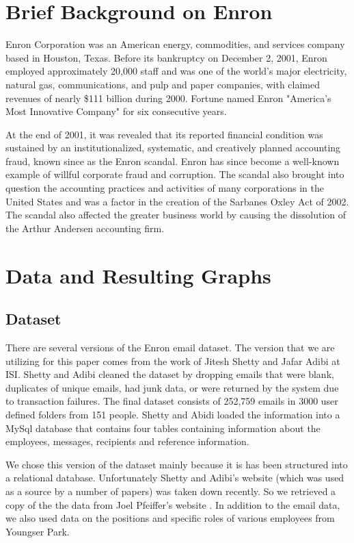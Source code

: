 \documentclass[12pt]{article}
\begin{document}
\section{Brief Background on Enron}
Enron Corporation was an American energy, commodities, and services company based in Houston, Texas. Before its bankruptcy on December 2, 2001, Enron employed approximately 20,000 staff and was one of the world's major electricity, natural gas, communications, and pulp and paper companies, with claimed revenues of nearly \$111 billion during 2000. Fortune named Enron "America's Most Innovative Company" for six consecutive years.

At the end of 2001, it was revealed that its reported financial condition was sustained by an institutionalized, systematic, and creatively planned accounting fraud, known since as the Enron scandal. Enron has since become a well-known example of willful corporate fraud and corruption. The scandal also brought into question the accounting practices and activities of many corporations in the United States and was a factor in the creation of the Sarbanes Oxley Act of 2002. The scandal also affected the greater business world by causing the dissolution of the Arthur Andersen accounting firm.

\section{Data and Resulting Graphs}
	\subsection{Dataset}
	There are several versions of the Enron email dataset. The version that we are utilizing for this paper comes from the work of Jitesh Shetty and Jafar Adibi \cite{shetty} at ISI. Shetty and Adibi cleaned the dataset by dropping emails that were blank, duplicates of unique emails, had junk data, or were returned by the system due to transaction failures. The final dataset consists of 252,759 emails in 3000 user defined folders from 151 people. Shetty and Abidi loaded the information into a MySql database that contains four tables containing information about the employees, messages, recipients and reference information. 
	
	We chose this version of the dataset mainly because it is has been structured into a relational database. Unfortunately Shetty and Adibi's website (which was used as a source by a number of papers) was taken down recently. So we retrieved a copy of the the data from Joel Pfeiffer's website \cite{pfeiffer}. In addition to the email data, we also used data on the positions and specific roles of various employees from Youngser Park\cite{park}.
	
\end{document}
